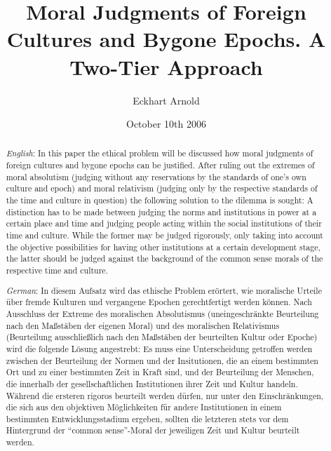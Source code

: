\documentclass[12pt,a4paper,ngerman]{article}
\begin{document}
\selectlanguage{\english}

\title{Moral Judgments of Foreign Cultures and Bygone Epochs. A Two-Tier Approach}
\author{Eckhart Arnold}
\date{October 10th 2006}

\maketitle

\begin{abstract}

  {\em English}: In this paper the ethical problem will be discussed
  how moral judgments of foreign cultures and bygone epochs can be
  justified.  After ruling out the extremes of moral absolutism
  (judging without any reservations by the standards of one's own
  culture and epoch) and moral relativism (judging only by the
  respective standards of the time and culture in question) the
  following solution to the dilemma is sought: A distinction has to be
  made between judging the norms and institutions in power at a
  certain place and time and judging people acting within the social
  institutions of their time and culture. While the former may be
  judged rigorously, only taking into account the objective
  possibilities for having other institutions at a certain development
  stage, the latter should be judged against the background of the
  common sense morals of the respective time and culture.

  {\em German}: In diesem Aufsatz wird das ethische Problem erörtert,
  wie moralische Urteile über fremde Kulturen und vergangene Epochen
  gerechtfertigt werden können. Nach Ausschluss der Extreme des
  moralischen Absolutismus (uneingeschränkte Beurteilung nach den
  Maßstäben der eigenen Moral) und des moralischen Relativismus
  (Beurteilung ausschließlich nach den Maßstäben der beurteilten
  Kultur oder Epoche) wird die folgende Lösung angestrebt: Es muss
  eine Unterscheidung getroffen werden zwischen der Beurteilung der
  Normen und der Insitutionen, die an einem bestimmten Ort und zu
  einer bestimmten Zeit in Kraft sind, und der Beurteilung der
  Menschen, die innerhalb der gesellschaftlichen Institutionen ihrer
  Zeit und Kultur handeln. Während die ersteren rigoros beurteilt
  werden dürfen, nur unter den Einschränkungen, die sich aus den
  objektiven Möglichkeiten für andere Institutionen in einem
  bestimmten Entwicklungsstadium ergeben, sollten die letzteren stets
  vor dem Hintergrund der ``common sense''-Moral der jeweiligen Zeit
  und Kultur beurteilt werden.


\end{abstract}
\end{document}
